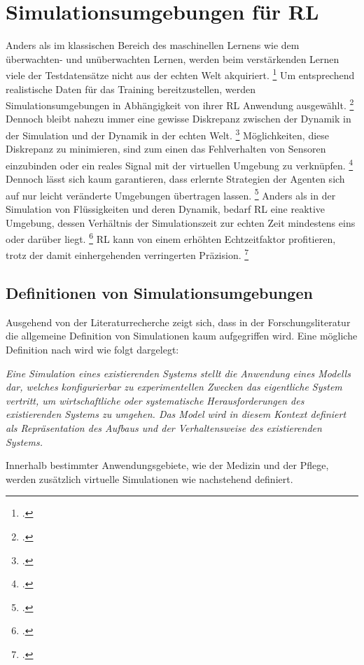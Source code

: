 \section{Simulationsumgebungen für RL}

Anders als im klassischen Bereich des maschinellen Lernens wie dem überwachten- und unüberwachten Lernen, werden beim verstärkenden Lernen viele der Testdatensätze nicht aus der echten Welt akquiriert. \footcite[Vgl.][S. 1]{Zhang.2018}
Um entsprechend realistische Daten für das Training bereitzustellen, werden Simulationsumgebungen in Abhängigkeit von ihrer RL Anwendung ausgewählt. \footcite[Vgl.][S. 7]{Korber.2021}
Dennoch bleibt nahezu immer eine gewisse Diskrepanz zwischen der Dynamik in der Simulation und der Dynamik in der echten Welt. \footcite[Vgl.][S. 1]{Bharadhwaj.2019}
Möglichkeiten, diese Diskrepanz zu minimieren, sind zum einen das Fehlverhalten von Sensoren einzubinden oder ein reales Signal mit der virtuellen Umgebung zu verknüpfen. \footcite[Vgl.][S. 1]{Zhang.2018}
Dennoch lässt sich kaum garantieren, dass erlernte Strategien der Agenten sich auf nur leicht veränderte Umgebungen übertragen lassen. \footcite[Vgl.][S. 1]{Bharadhwaj.2019}
Anders als in der Simulation von Flüssigkeiten und deren Dynamik, bedarf RL eine reaktive Umgebung, dessen Verhältnis der Simulationszeit zur echten Zeit mindestens eins oder darüber liegt. \footcite[Vgl.][S. 3]{Korber.2021}
RL kann von einem erhöhten Echtzeitfaktor profitieren, trotz der damit einhergehenden verringerten Präzision. \footcite[Vgl.][S. 3]{Korber.2021}

\subsection{Definitionen von Simulationsumgebungen}
Ausgehend von der Literaturrecherche zeigt sich, dass in der Forschungsliteratur die allgemeine Definition von Simulationen kaum aufgegriffen wird.
Eine mögliche Definition nach \cite[]{Maria.1997} wird wie folgt dargelegt:

\textit{Eine Simulation eines existierenden Systems stellt die Anwendung eines Modells dar, welches konfigurierbar zu experimentellen Zwecken das eigentliche System vertritt, um wirtschaftliche oder systematische Herausforderungen des existierenden Systems zu umgehen.
Das Model wird in diesem Kontext definiert als Repräsentation des Aufbaus und der Verhaltensweise des existierenden Systems.}

Innerhalb bestimmter Anwendungsgebiete, wie der Medizin und der Pflege, werden zusätzlich virtuelle Simulationen wie nachstehend definiert.

